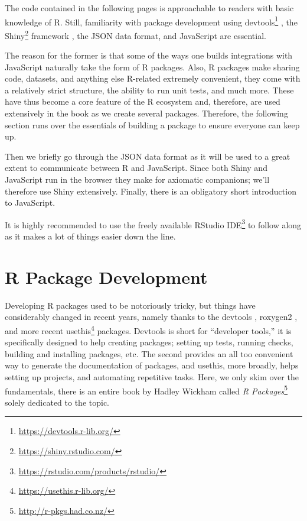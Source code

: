 \documentclass[10pt,]{krantz}
\renewcommand{\href}[2]{#2\footnote{\url{#1}}}
\begin{document}
The code contained in the following pages is approachable to readers with basic knowledge of R. Still, familiarity with package development using \href{https://devtools.r-lib.org/}{devtools} \citep{R-devtools}, the \href{https://shiny.rstudio.com/}{Shiny} framework \citep{R-shiny}, the JSON data format, and JavaScript are essential.

The reason for the former is that some of the ways one builds integrations with JavaScript naturally take the form of R packages. Also, R packages make sharing code, datasets, and anything else R-related extremely convenient, they come with a relatively strict structure, the ability to run unit tests, and much more. These have thus become a core feature of the R ecosystem and, therefore, are used extensively in the book as we create several packages. Therefore, the following section runs over the essentials of building a package to ensure everyone can keep up.

Then we briefly go through the JSON data format as it will be used to a great extent to communicate between R and JavaScript. Since both Shiny and JavaScript run in the browser they make for axiomatic companions; we'll therefore use Shiny extensively. Finally, there is an obligatory short introduction to JavaScript.

It is highly recommended to use the freely available \href{https://rstudio.com/products/rstudio/}{RStudio IDE} to follow along as it makes a lot of things easier down the line.

\hypertarget{basics-package-dev}{%
\section{R Package Development}\label{basics-package-dev}}

Developing R packages used to be notoriously tricky, but things have considerably changed in recent years, namely thanks to the devtools \citep{R-devtools}, roxygen2 \citep{R-roxygen2}, and more recent \href{https://usethis.r-lib.org/}{usethis} \citep{R-usethis} packages. Devtools is short for ``developer tools,'' it is specifically designed to help creating packages; setting up tests, running checks, building and installing packages, etc. The second provides an all too convenient way to generate the documentation of packages, and usethis, more broadly, helps setting up projects, and automating repetitive tasks. Here, we only skim over the fundamentals, there is an entire book by Hadley Wickham called \href{http://r-pkgs.had.co.nz/}{\emph{R Packages}} solely dedicated to the topic.
\end{document}
